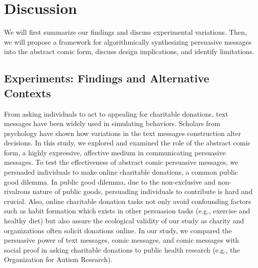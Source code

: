 \section{Discussion}
\label{sec:Discussion}
We will first summarize our findings and discuss experimental variations. Then, we will propose a framework for algorithmically synthesizing persuasive messages into the abstract comic form, discuss design implications, and identify limitations.

\subsection{Experiments: Findings and Alternative Contexts}
\label{sub:Experiments: Findings and Alternate Contexts}

From asking individuals to act to appealing for charitable donations, text messages have been widely used in simulating behaviors. Scholars from psychology have shown how variations in the text messages construction alter decisions. In this study, we explored and examined the role of the abstract comic form, a highly expressive, affective medium in communicating persuasive messages. To test the effectiveness of abstract comic persuasive messages, we persuaded individuals to make online charitable donations, a common public good dilemma. In public good dilemma, due to the non-exclusive and non-rivalrous nature of public goods, persuading individuals to contribute is hard and crucial. Also, online charitable donation tasks not only avoid confounding factors such as habit formation which exists in other persuasion tasks (e.g., exercise and healthy diet) but also assure the ecological validity of our study as charity and organizations often solicit donations online. In our study, we compared the persuasive power of text messages, comic messages, and comic messages with social proof in asking charitable donations to public health research (e.g., the Organization for Autism Research).

